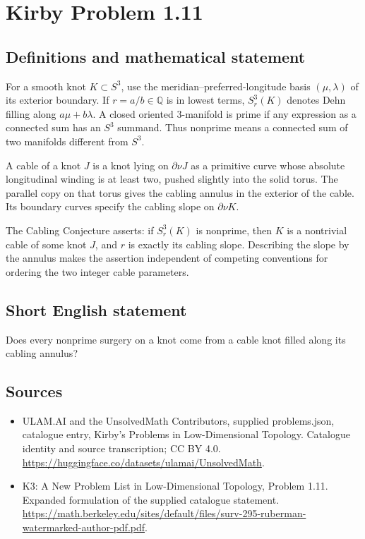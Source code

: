 \documentclass[11pt,a4paper]{article}
\begin{document}
\section*{Kirby Problem 1.11}\label{statement}

\subsection{Definitions and mathematical statement}
For a smooth knot $K\subset S^3$, use the meridian--preferred-longitude basis
$(\mu,\lambda)$ of its exterior boundary. If $r=a/b\in\mathbb Q$ is in lowest
terms, $S^3_r(K)$ denotes Dehn filling along $a\mu+b\lambda$.
A closed oriented $3$-manifold is prime if any expression as a connected sum has
an $S^3$ summand. Thus nonprime means a connected sum of two manifolds different
from $S^3$.

A cable of a knot $J$ is a knot lying on $\partial\nu J$ as a primitive curve
whose absolute longitudinal winding is at least two, pushed slightly into the
solid torus. The parallel copy on that torus gives the cabling annulus in the
exterior of the cable. Its boundary curves specify the cabling slope on
$\partial\nu K$.

The Cabling Conjecture asserts: if $S^3_r(K)$ is nonprime, then $K$ is a nontrivial
cable of some knot $J$, and $r$ is exactly its cabling slope. Describing the slope
by the annulus makes the assertion independent of competing conventions for
ordering the two integer cable parameters.
\subsection{Short English statement}
Does every nonprime surgery on a knot come from a cable knot filled along its cabling annulus?
\subsection{Sources}
\begin{itemize}
\item[S1] ULAM.AI and the UnsolvedMath Contributors, supplied problems.json, catalogue entry, Kirby's Problems in Low-Dimensional Topology. Catalogue identity and source transcription; CC BY 4.0.
\url{https://huggingface.co/datasets/ulamai/UnsolvedMath}.
\item[S2] K3: A New Problem List in Low-Dimensional Topology, Problem 1.11. Expanded formulation of the supplied catalogue statement.
\url{https://math.berkeley.edu/sites/default/files/surv-295-ruberman-watermarked-author-pdf.pdf}.
\end{itemize}
\end{document}
